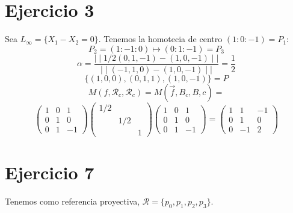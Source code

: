 \documentclass[10pt,a4paper,openright]{book}
\theoremstyle{break}
\begin{document}
\section{Ejercicio 3}%
\label{sec:ejercicio_3_3}
Sea $L_{\infty} = \{X_1 - X_2 = 0\}$. Tenemos la homotecia de centro $\left( 1 : 0 : -1 \right) = P_1$:
\[
P_2 = \left( 1 : -1 : 0 \right) \mapsto \left( 0 : 1 : -1 \right) = P_3
\]
\[
    \alpha = \frac{\mid \mid 1/2 \left( 0, 1, -1 \right) - \left( 1, 0, -1 \right) \mid \mid}{\mid \mid \left( -1, 1, 0 \right) - \left( 1, 0, -1 \right)\mid \mid} = \frac{1}{2} 
\]
\[
\{\left( 1, 0, 0 \right), \left( 0, 1, 1 \right), \left( 1, 0, -1 \right)\} = P
\]
\[
M\left( f, \mathcal{R}_c, \mathcal{R}_c \right) = M\left( \overrightarrow{f}, B_c, B,c \right) =
\]\[
\begin{pmatrix} 1 & 0 & 1\\ 0 & 1 & 0\\ 0 & 1 & -1 \end{pmatrix} \begin{pmatrix} 1/2 & & \\& 1/2 &\\ & & 1 \end{pmatrix} \begin{pmatrix} 1 & 0 & 1\\ 0 & 1 & 0\\ 0 & 1 & -1 \end{pmatrix} = \begin{pmatrix} 1 & 1 & -1\\ 0 & 1 & 0\\ 0 & -1 & 2 \end{pmatrix} 
\]
\section{Ejercicio 7}%
\label{sec:ejercicio_7_3}
Tenemos como referencia proyectiva, $\mathcal{R} = \{p_0, p_1, p_2, p_3\}$. 
\end{document}
